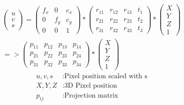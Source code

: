 \documentclass[11pt,a4paper,titlepage,oneside]{report}
\begin{document}
\begin{equation}\label{eq:pe_warped}
  \begin{split}
  \begin{pmatrix}
    u \\
    v \\
    s
  \end{pmatrix}=
  \begin{pmatrix}
    f_x & 0 & c_x \\
    0 & f_y & c_y \\
    0 & 0 & 1
  \end{pmatrix}*
  \begin{pmatrix}
    r_{11} & r_{12} & r_{13} & t_{1} \\
    r_{21} & r_{22} & r_{23} & t_{2} \\
    r_{31} & r_{32} & r_{33} & t_{3}
  \end{pmatrix}*
  \begin{pmatrix}
    X\\
    Y\\
    Z\\
    1
  \end{pmatrix}\\
  =>\begin{pmatrix}
    p_{11} & p_{12} & p_{13} & p_{14} \\
    p_{21} & p_{22} & p_{23} & p_{24} \\
    p_{31} & p_{32} & p_{33} & p_{34}
  \end{pmatrix}*
  \begin{pmatrix}
    X\\
    Y\\
    Z\\
    1
  \end{pmatrix}
\end{split}
\end{equation}
\begin{align*}
  u,v,s     &: \text{Pixel position scaled with s}\\
  X,Y,Z     &: \text{3D Pixel position}\\
  p_{ij}		&: \text{Projection matrix}\\
\end{align*}
\end{document}
